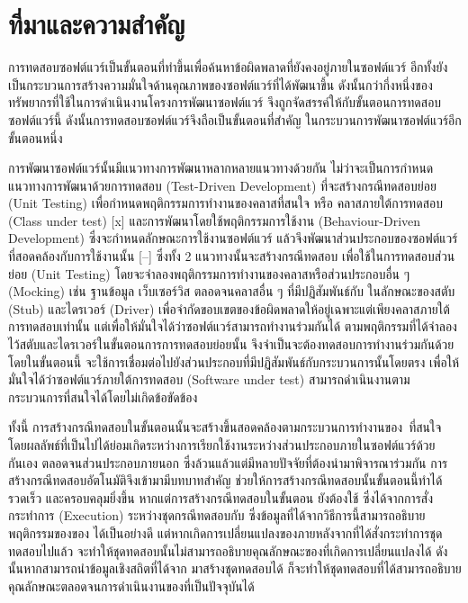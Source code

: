 \section{ที่มาและความสำคัญ} 
\label{sec:introduction}

การทดสอบซอฟต์แวร์เป็นขั้นตอนที่ทำขึ้นเพื่อค้นหาข้อผิดพลาดที่ยังคงอยู่ภายในซอฟต์แวร์ \cite{Myers:2011:AST:983238} 
อีกทั้งยังเป็นกระบวนการสร้างความมั่นใจด้านคุณภาพของซอฟต์แวร์ที่ได้พัฒนาขึ้น ดังนั้นกว่ากึ่งหนึ่งของทรัพยากรที่ใช้ในการดำเนินงานโครงการพัฒนาซอฟต์แวร์
จึงถูกจัดสรรค์ให้กับขั้นตอนการทดสอบซอฟต์แวร์นี้ \cite{Jackson2007, Tassey2002} ดังนั้นการทดสอบซอฟต์แวร์จึงถือเป็นขั้นตอนที่สำคัญ
ในกระบวนการพัฒนาซอฟต์แวร์อีกขั้นตอนหนึ่ง

การพัฒนาซอฟต์แวร์นั้นมีแนวทางการพัฒนาหลากหลายแนวทางด้วยกัน ไม่ว่าจะเป็นการกำหนดแนวทางการพัฒนาด้วยการทดสอบ (Test-Driven Development) 
ที่จะสร้างกรณีทดสอบย่อย (Unit Testing) เพื่อกำหนดพฤติกรรมการทำงานของคลาสที่สนใจ หรือ คลาสภายใต้การทดสอบ (Class under test) [x]
และการพัฒนาโดยใช้พฤติกรรมการใช้งาน (Behaviour-Driven Development) ซึ่งจะกำหนดลักษณะการใช้งานซอฟต์แวร์
แล้วจึงพัฒนาส่วนประกอบของซอฟต์แวร์ที่สอดคล้องกับการใช้งานนั้น [--] 
ซึ่งทั้ง 2 แนวทางนั้นจะสร้างกรณีทดสอบ เพื่อใช้ในการทดสอบส่วนย่อย (Unit Testing) โดยจะจำลองพฤติกรรมการทำงานของคลาสหรือส่วนประกอบอื่น ๆ
(Mocking) เช่น ฐานข้อมูล เว็บเซอร์วิส ตลอดจนคลาสอื่น ๆ ที่มีปฏิสัมพันธ์กับ\FirstTimeDefine{\CUT}{\CUTEN} ในลักษณะของสตับ (Stub) และไดรเวอร์ (Driver)
เพื่อจำกัดขอบเขตของข้อผิดพลาดให้อยู่เฉพาะแต่เพียงคลาสภายใต้การทดสอบเท่านั้น แต่เพื่อให้มั่นใจได้ว่าซอฟต์แวร์สามารถทำงานร่วมกันได้ 
ตามพฤติกรรมที่ได้จำลองไว้สตับและไดรเวอร์ในขั้นตอนการการทดสอบย่อยนั้น 
จึงจำเป็นจะต้องทดสอบการทำงานร่วมกันด้วย\FirstTimeDefine{\IntegrationTesting}{\IntegrationTestingEN}
โดยในขั้นตอนนี้ จะใช้การเชื่อมต่อไปยังส่วนประกอบที่มีปฏิสัมพันธ์กับกระบวนการนั้นโดยตรง เพื่อให้มั่นใจได้ว่าซอฟต์แวร์ภายใต้การทดสอบ (Software under test) 
สามารถดำเนินงานตามกระบวนการที่สนใจได้โดยไม่เกิดข้อขัดข้อง

ทั้งนี้ การสร้างกรณีทดสอบในขั้นตอน{\IntegrationTesting}นั้นจะสร้างขึ้นสอดคล้องตามกระบวนการทำงานของ\FirstTimeDefine{\SUT}{\SUTEN}\ ที่สนใจ 
โดยผลลัพธ์ที่เป็นไปได้ย่อมเกิดระหว่างการเรียกใช้งานระหว่างส่วนประกอบภายในซอฟต์แวร์{\SUT}ด้วยกันเอง ตลอดจนส่วนประกอบภายนอก 
ซึ่งล้วนแล้วแต่มีหลายปัจจัยที่ต้องนำมาพิจารณาร่วมกัน การสร้างกรณีทดสอบอัตโนมัติจึงเข้ามามีบทบาทสำคัญ ช่วยให้การสร้างกรณีทดสอบนั้นขั้นตอนนี้ทำได้รวดเร็ว และครอบคลุมยิ่งขึ้น
หากแต่การสร้างกรณีทดสอบในขั้นตอน{\IntegrationTesting} ยังต้องใช้\FirstTimeDefine{\DynamicInformation}{\DynamicInformationEN}
ซึ่งได้จากการสั่งกระทำการ (Execution) ระหว่างชุดกรณีทดสอบกับ{\sourcecode} ซึ่งข้อมูลที่ได้จากวิธีการนี้สามารถอธิบายพฤติกรรมของ{\SUT}ของ{\sourcecode}
ได้เป็นอย่างดี แต่หากเกิดการเปลี่ยนแปลงของ{\sourcecode}ภายหลังจากที่ได้สั่งกระทำการชุดทดสอบไปแล้ว 
จะทำให้ชุดทดสอบนั้นไม่สามารถอธิบายคุณลักษณะของ{\sourcecode}ที่เกิดการเปลี่ยนแปลงได้ ดังนั้นหากสามารถนำข้อมูลเชิงสถิตที่ได้จาก{\sourcecode}
มาสร้างชุดทดสอบได้ ก็จะทำให้ชุดทดสอบที่ได้สามารถอธิบายคุณลักษณะตลอดจนการดำเนินงานของ{\SUT}ที่เป็นปัจจุบันได้

